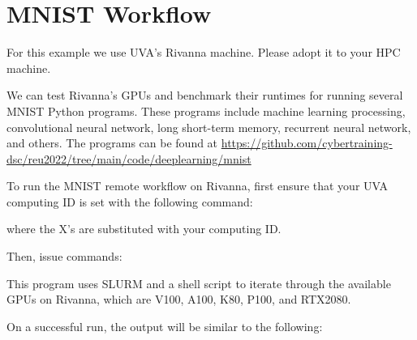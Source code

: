 \section{MNIST Workflow}\label{mnist-workflow}

For this example we use UVA's Rivanna machine. Please adopt it to your
HPC machine.

We can test Rivanna's GPUs and benchmark their runtimes for running
several MNIST Python programs. These programs include machine learning
processing, convolutional neural network, long short-term memory,
recurrent neural network, and others. The programs can be found at
\url{https://github.com/cybertraining-dsc/reu2022/tree/main/code/deeplearning/mnist}

To run the MNIST remote workflow on Rivanna, first ensure that your UVA
computing ID is set with the following command:

\begin{Shaded}
\begin{Highlighting}[]
\end{Highlighting}
\end{Shaded}

where the X's are substituted with your computing ID.

Then, issue commands:

\begin{Shaded}
\begin{Highlighting}[]
   \OperatorTok{=}
\end{Highlighting}
\end{Shaded}

This program uses SLURM and a shell script to iterate through the
available GPUs on Rivanna, which are V100, A100, K80, P100, and RTX2080.

On a successful run, the output will be similar to the following:

